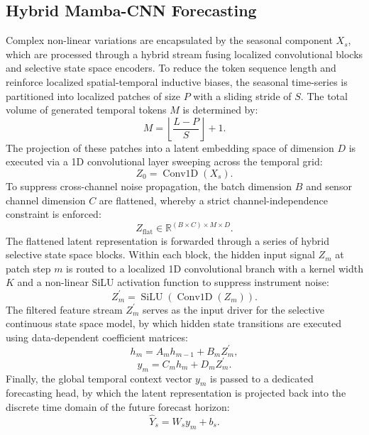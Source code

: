 \documentclass[runningheads]{llncs}
\begin{document}
\subsection{Hybrid Mamba-CNN Forecasting} \label{sect:s3dot3}
Complex non-linear variations are encapsulated by the seasonal component $X_{s}$, which are processed through a hybrid stream fusing localized convolutional blocks and selective state space encoders. To reduce the token sequence length and reinforce localized spatial-temporal inductive biases, the seasonal time-series is partitioned into localized patches of size $P$ with a sliding stride of $S$. The total volume of generated temporal tokens $M$ is determined by:
\begin{equation}
M = \left\lfloor \frac{L - P}{S} \right\rfloor + 1.
\tag{4}
\end{equation}
The projection of these patches into a latent embedding space of dimension $D$ is executed via a 1D convolutional layer sweeping across the temporal grid:
\begin{equation}
Z_{0} = \operatorname{Conv1D}(X_{s}).
\tag{5}
\end{equation}
To suppress cross-channel noise propagation, the batch dimension $B$ and sensor channel dimension $C$ are flattened, whereby a strict channel-independence constraint is enforced:
\begin{equation}
Z_{\text{flat}} \in \mathbb{R}^{(B \times C) \times M \times D}.
\tag{6}
\end{equation}
The flattened latent representation is forwarded through a series of hybrid selective state space blocks. Within each block, the hidden input signal $Z_{m}$ at patch step $m$ is routed to a localized 1D convolutional branch with a kernel width $K$ and a non-linear SiLU activation function to suppress instrument noise:
\begin{equation}
Z_{m}^{\prime} = \operatorname{SiLU}\left(\operatorname{Conv1D}(Z_{m})\right).
\tag{7}
\end{equation}
The filtered feature stream $Z_{m}^{\prime}$ serves as the input driver for the selective continuous state space model, by which hidden state transitions are executed using data-dependent coefficient matrices:
\begin{equation}
h_{m} = A_{m} h_{m-1} + B_{m} Z_{m}^{\prime},
\tag{8}
\end{equation}
\begin{equation}
y_{m} = C_{m} h_{m} + D_{m} Z_{m}^{\prime}.
\tag{9}
\end{equation}
Finally, the global temporal context vector $y_{m}$ is passed to a dedicated forecasting head, by which the latent representation is projected back into the discrete time domain of the future forecast horizon:
\begin{equation}
\widehat{Y}_{s} = W_{s} y_{m} + b_{s}.
\tag{10}
\end{equation}
\end{document}
